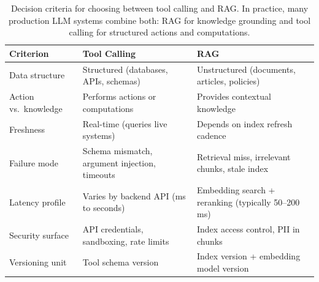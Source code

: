 \begin{table}[t]
\centering
\small
\caption{Decision criteria for choosing between tool calling and RAG. In practice, many production LLM systems combine both: RAG for knowledge grounding and tool calling for structured actions and computations.}
\label{tab:ch02_tool_vs_rag}
\setlength{\tabcolsep}{5pt}
\renewcommand{\arraystretch}{1.3}
\begin{tabularx}{\linewidth}{@{}>{\raggedright\arraybackslash}p{28mm}>{\raggedright\arraybackslash}X>{\raggedright\arraybackslash}X@{}}
\toprule
\rowcolor{gray!15}
\textbf{Criterion} & \textbf{Tool Calling} & \textbf{RAG} \\
\midrule
Data structure & Structured (databases, APIs, schemas) & Unstructured (documents, articles, policies) \\
\addlinespace[2pt]
Action vs.\ knowledge & Performs actions or computations & Provides contextual knowledge \\
\addlinespace[2pt]
Freshness & Real-time (queries live systems) & Depends on index refresh cadence \\
\addlinespace[2pt]
Failure mode & Schema mismatch, argument injection, timeouts & Retrieval miss, irrelevant chunks, stale index \\
\addlinespace[2pt]
Latency profile & Varies by backend API (ms to seconds) & Embedding search + reranking (typically 50--200\,ms) \\
\addlinespace[2pt]
Security surface & API credentials, sandboxing, rate limits & Index access control, PII in chunks \\
\addlinespace[2pt]
Versioning unit & Tool schema version & Index version + embedding model version \\
\bottomrule
\end{tabularx}
\end{table}

